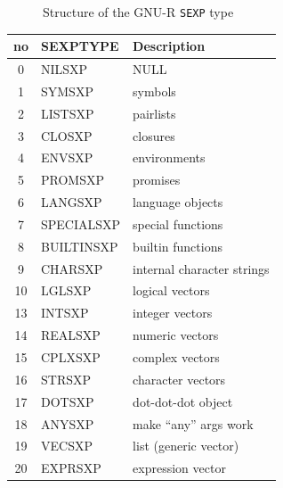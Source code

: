 \begin{figure}
	\centering
	\begin{adjustbox}{trim=5pt 20pt 0 40pt, clip}
	\end{adjustbox}
	\caption{Structure of the GNU-R \texttt{SEXP} type}\label{fig:sexp-struct}
\end{figure}

\begin{table}[h!]
	\centering
	\begin{tabular}{c l l}
		\hline
		\textbf{no} & \textbf{SEXPTYPE} & \textbf{Description}       \\
		\hline
		0           & NILSXP            & NULL                       \\
		1           & SYMSXP            & symbols                    \\
		2           & LISTSXP           & pairlists                  \\
		3           & CLOSXP            & closures                   \\
		4           & ENVSXP            & environments               \\
		5           & PROMSXP           & promises                   \\
		6           & LANGSXP           & language objects           \\
		7           & SPECIALSXP        & special functions          \\
		8           & BUILTINSXP        & builtin functions          \\
		9           & CHARSXP           & internal character strings \\
		10          & LGLSXP            & logical vectors            \\
		13          & INTSXP            & integer vectors            \\
		14          & REALSXP           & numeric vectors            \\
		15          & CPLXSXP           & complex vectors            \\
		16          & STRSXP            & character vectors          \\
		17          & DOTSXP            & dot-dot-dot object         \\
		18          & ANYSXP            & make “any” args work       \\
		19          & VECSXP            & list (generic vector)      \\
		20          & EXPRSXP           & expression vector          \\

\end{tabular}
\end{table}
